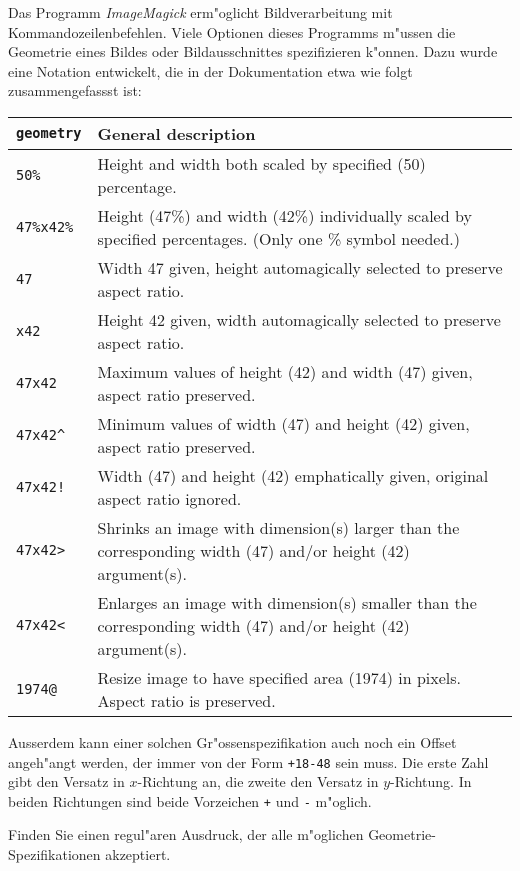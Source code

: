 Das Programm {\em ImageMagick} erm"oglicht Bildverarbeitung mit
Kommandozeilenbefehlen. Viele Optionen dieses Programms m"ussen die
Geometrie eines Bildes oder Bildausschnittes spezifizieren k"onnen.
Dazu wurde eine Notation entwickelt, die in der Dokumentation etwa
wie folgt zusammengefassst ist:
\begin{center}
\begin{tabular}{>{\tt}lp{5.75in}}
\rm geometry&General description\\
\hline
50\%&Height and width both scaled by specified (50) percentage.\\
47\%x42\%&Height (47\%) and width (42\%) individually scaled by specified
percentages. (Only one \% symbol needed.)\\
47&Width 47 given, height automagically selected to preserve aspect ratio.\\
x42&Height 42 given, width automagically selected to preserve aspect ratio.\\
47x42&Maximum values of height (42) and width (47) given, aspect ratio
preserved.\\
47x42\^&Minimum values of width (47) and height (42) given, aspect ratio
preserved.\\
47x42!&Width (47) and height (42) emphatically given, original
aspect ratio ignored.\\
47x42>&Shrinks an image with dimension(s) larger than the
corresponding width (47) and/or height (42) argument(s).\\
47x42<&Enlarges an image with dimension(s) smaller than the
corresponding width (47) and/or height (42) argument(s).\\
1974@&Resize image to have specified area (1974) in pixels. Aspect ratio is
preserved.\\
\hline
\end{tabular}
\end{center}
Ausserdem kann einer solchen Gr"ossenspezifikation auch noch ein Offset
angeh"angt werden, der immer von der Form
\texttt{+18-48}
sein muss. Die erste Zahl gibt den Versatz in $x$-Richtung an, die zweite
den Versatz in $y$-Richtung. In beiden Richtungen sind beide Vorzeichen 
\texttt{+} und \texttt{-} m"oglich.

Finden Sie einen regul"aren Ausdruck, der alle m"oglichen
Geometrie-Spezifikationen akzeptiert.


